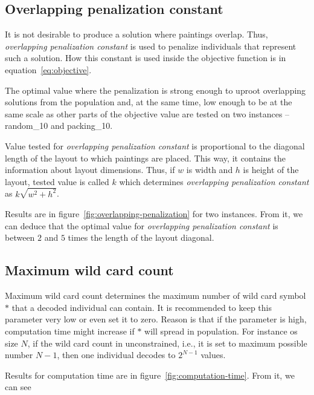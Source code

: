\subsection{Overlapping penalization constant}\label{subsec:overlapping-penalization-constant}

It is not desirable to produce a solution where paintings overlap.
Thus, \textit{overlapping penalization constant} is used to penalize
individuals that represent such a solution.
How this constant is used inside the objective function is in equation~\ref{eq:objective}.

The optimal value where the penalization is strong enough
to uproot overlapping solutions from the population and, at the same time, low enough
to be at the same scale as other parts of the objective value are tested on two instances – random\_10 and packing\_10.

Value tested for \textit{overlapping penalization constant} is proportional to the diagonal length of the layout to which paintings are placed.
This way, it contains the information about layout dimensions.
Thus, if $w$ is width and $h$ is height of the layout, tested value is called $k$ which determines
\textit{overlapping penalization constant} as $k\sqrt{w^2 + h^2}$.

Results are in figure~\ref{fig:overlapping-penalization} for two instances.
From it, we can deduce that the optimal value for \textit{overlapping penalization constant} is between $2$ and $5$ times the length of the layout diagonal.

\subsection{Maximum wild card count}\label{subsec:maximum-wild-card-count}
Maximum wild card count determines the maximum number of wild card symbol $*$ that a decoded individual can contain.
It is recommended to keep this parameter very low or even set it to zero.
Reason is that if the parameter is high, computation time might increase if $*$ will spread in population.
For instance os size $N$, if the wild card count in unconstrained, i.e., it is set to maximum possible number $N-1$,
then one individual decodes to $2^{N-1}$ values.

Results for computation time are in figure~\ref{fig:computation-time}.
From it, we can see